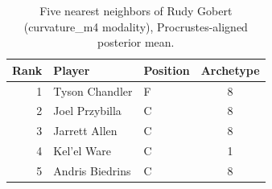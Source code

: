 \begin{table}[htbp]
  \centering\small
  \begin{tabular}{rllc}
    \toprule
    Rank & Player & Position & Archetype \\
    \midrule
    1 & Tyson Chandler & F & 8 \\
    2 & Joel Przybilla & C & 8 \\
    3 & Jarrett Allen & C & 8 \\
    4 & Kel'el Ware & C & 1 \\
    5 & Andris Biedrins & C & 8 \\
    \bottomrule
  \end{tabular}
  \caption{Five nearest neighbors of Rudy Gobert (curvature_m4 modality), Procrustes-aligned posterior mean.}
  \label{tab:Rudy_Gobert_neighbors_curvature_m4}
\end{table}

